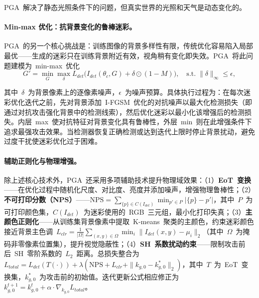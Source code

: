 PGA~解决了静态光照条件下的问题，但真实世界的光照和天气是动态变化的。

\paragraph{Min-max 优化：抗背景变化的鲁棒迷彩。}
PGA~的另一个核心挑战是：训练图像的背景多样性有限，传统优化容易陷入局部最优——生成的迷彩只在训练背景附近有效，视角稍有变化即失效。PGA~将此问题建模为~min-max~优化
\begin{equation}
    G' = \min_{G} \max_{\delta} L_{det}\bigl(I_{det}(\theta_c, G) + \delta \odot (1 - M)\bigr), \quad \text{s.t.} \; \|\delta\|_\infty \leq \epsilon,
\end{equation}

其中~$\delta$~为背景像素上的逐像素噪声，$\epsilon$~为噪声预算。具体执行过程为：在每次迷彩优化迭代之前，先对背景添加~I-FGSM~优化的对抗噪声以最大化检测损失（即通过对抗攻击强化背景中的检测线索），然后优化迷彩以最小化该增强后的检测损失。内层~max~使对抗特征对背景变化具有鲁棒性，外层~min~则在此增强条件下追求最强攻击效果。当检测器恢复正确检测或达到迭代上限时停止背景扰动，避免过度干扰使迷彩优化过于困难。

\paragraph{辅助正则化与物理增强。}
除上述核心技术外，PGA~还采用多项辅助技术提升物理域效果：（1）\textbf{EoT~变换}——在优化过程中随机化尺度、对比度、亮度并添加噪声，增强物理鲁棒性；（2）\textbf{不可打印分数（NPS）}——$\mathrm{NPS} = \sum_{\{p\} \in C(I_{det})} \min_{p' \in P} |\{p\} - p'|$，其中~$P$~为可打印颜色集，$C(I_{det})$~为迷彩使用的~RGB~三元组，最小化打印失真；（3）\textbf{主颜色正则化}——从训练集背景像素中提取~K-means~聚类的主颜色，约束迷彩颜色接近背景主色调~$L_{clr} = \frac{1}{|\Omega|} \sum_{(x,y) \in \Omega} \min_i \|I_{det}(x,y) - \mu_i\|_2$（其中~$\Omega$~为掩码非零像素位置集），提升视觉隐蔽性；（4）\textbf{SH~系数扰动约束}——限制攻击前后~SH~零阶系数的~$L_2$~距离。总损失整合为~$L_{total} = L_{det}(T(\cdot)) + \lambda(\mathrm{NPS} + L_{clr} + \|k_{g,0} - k_{g,0}^*\|_2)$，其中~$T$~为~EoT~变换集，$k_{g,0}^*$~为攻击前的初始值。迭代更新公式相应修正为~$k_{g,0}^{t+1} = k_{g,0}^t + \alpha \cdot \nabla_{k_{g,0}} L_{total}$。


